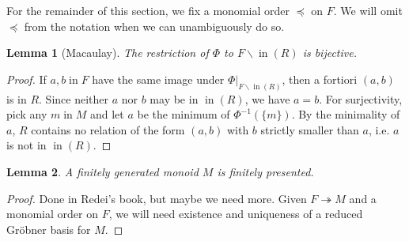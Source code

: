 \documentclass[a4paper,12pt]{amsart} %
\numberwithin{equation}{subsection}
\renewcommand{\in}{\operatorname{in}}
\theoremstyle{definition}
\newtheorem{definition}{Definition}[section]
\theoremstyle{plain}%
\newtheorem{lemma}[definition]{Lemma}
\theoremstyle{remark}
\newtheorem{remark}[definition]{Remark}
\begin{document}
For the remainder of this section, we fix a monomial order $\preceq$ on $F$. We will omit $\preceq$ from the notation when we can unambiguously do so.

\begin{lemma}[Macaulay]
	The restriction of $\Phi$ to $F\backslash\in(R)$ is bijective.
\end{lemma}

\begin{proof}
	If $a,b\in F$ have the same image under $\Phi|_{F\backslash\in(R)}$, then a fortiori $(a,b)$ is in $R$. Since neither $a$ nor $b$ may be in $\in(R)$, we have $a=b$. For surjectivity, pick any $m\in M$ and let $a$ be the minimum of $\Phi^{-1}(\{m\})$. By the minimality of $a$, $R$ contains no relation of the form $(a,b)$ with $b$ strictly smaller than $a$, i.e. $a$ is not in $\in(R)$.
\end{proof}

\begin{comment}
	Too detailed?
\begin{definition}
	Let $M$ be a monoid and $R$ a subset of $M\times M$. We say $R$ is \emph{$M$-stable} if for all $m\in M$ we have $(m,m)+R\subset R$. The \emph{monoidal equivalence relation generated by $R$} is the smallest $M$-stable equivalence relation $\tilde R\subset M\times M$ containing $R$. The \emph{monoidal quotient of $M$ by $R$} is the monoid $M/\tilde R$, which comes with a surjective monoid map $M \to M/\tilde R$. We will almost always simply call it the \emph{quotient of $M$ by $R$} and denote it by $M/R$.
\end{definition}

\begin{remark}
	If $M \to N$ is a surjective monoid map, the corresponding equivalence relation on $M$ is $M$-stable, so there is a natural contravariant equivalence between surjective morphisms $M \to N$ and $M$-stable equivalence relations on $M\times M$ ordered by inclusion.
\end{remark}
\end{comment}


\begin{lemma}
	A finitely generated monoid $M$ is finitely presented.
\end{lemma}

\begin{proof}
	Done in Redei's book, but maybe we need more. Given $F\twoheadrightarrow M$ and a monomial order on $F$, we will need existence and uniqueness of a reduced Gr\"obner basis for $M$.
\end{proof}
\end{document}
